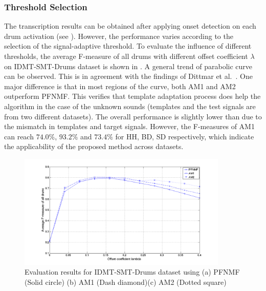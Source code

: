 \documentclass{article}
\begin{document}
\subsubsection{Threshold Selection}\label{subsec:threshold}
The transcription results can be obtained after applying onset detection on each drum activation (see ). However, the performance varies according to the selection of the signal-adaptive threshold. To evaluate the influence of different thresholds, the average F-measure of all drums with different offset coefficient $\lambda$ on IDMT-SMT-Drums dataset is shown in . A general trend of parabolic curve can be observed. This is in agreement with the findings of Dittmar et al.\ \cite{Dittmar2014}. One major difference is that in most regions of the curve, both AM1 and AM2 outperform PFNMF. This verifies that template adaptation process does help the algorithm in the case of the unknown sounds (templates and the test signals are from two different datasets). The overall performance is slightly lower than \cite{Dittmar2014} due to the mismatch in templates and target signals. However, the F-measures of AM1 can reach $74.0\%$, $93.2\%$ and $73.4\%$ for HH, BD, SD respectively, which indicate the applicability of the proposed method across datasets. 

\begin{figure}
 \centerline{
 \includegraphics[width=10cm]{thresSelect.png}}
 \caption{Evaluation results for IDMT-SMT-Drums dataset using (a) PFNMF (Solid circle) (b) AM1 (Dash diamond)(c) AM2 (Dotted square)}%
 \label{fig:thresTest}
\end{figure}
\end{document}
